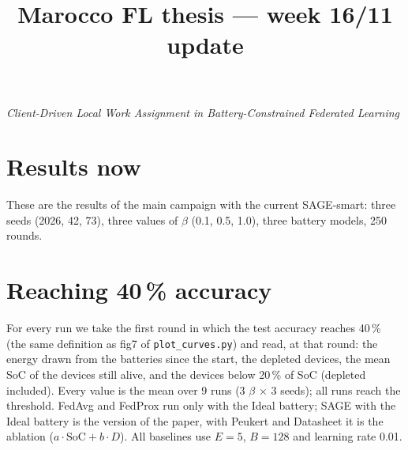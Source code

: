 \documentclass[11pt,a4paper]{article}
\title{\bfseries Marocco FL thesis --- week 16/11 update}
\author{}
\date{}
\begin{document}
\maketitle
\vspace{-3.2em}
\begin{center}
\emph{Client-Driven Local Work Assignment in Battery-Constrained Federated Learning}
\end{center}
\vspace{1em}

\section{Results now}
\label{sec:results}

These are the results of the main campaign with the current SAGE-smart: three
seeds (2026, 42, 73), three values of $\beta$ (0.1, 0.5, 1.0), three battery
models, 250 rounds.

\newpage

\section{Reaching 40\,\% accuracy}
\label{sec:thr}

For every run we take the first round in which the test accuracy reaches
40\,\% (the same definition as fig7 of \texttt{plot\_curves.py}) and read, at
that round: the energy drawn from the batteries since the start, the depleted
devices, the mean SoC of the devices still alive, and the devices below 20\,\%
of SoC (depleted included). Every value is the mean over 9 runs (3 $\beta$
$\times$ 3 seeds); all runs reach the threshold. FedAvg and FedProx run only
with the Ideal battery; SAGE with the Ideal battery is the version of the
paper, with Peukert and Datasheet it is the ablation ($a \cdot \mathrm{SoC} + b
\cdot D$). All baselines use $E = 5$, $B = 128$ and learning rate 0.01.
\end{document}
